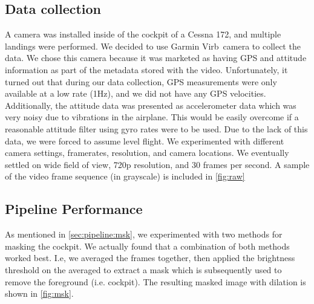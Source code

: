 \documentclass[letterpaper, conference]{IEEEtran}  %
\begin{document}
\subsection{Data collection}
A camera was installed inside of the cockpit of a Cessna 172, and multiple landings were performed. We decided to use Garmin Virb\texttrademark  \ camera to collect the data. We chose this camera because it was marketed as having GPS and attitude information as part of the metadata stored with the video. Unfortunately, it turned out that during our data collection, GPS measurements were only available at a low rate (1Hz), and we did not have any GPS velocities. Additionally, the attitude data was presented as accelerometer data which was very noisy due to vibrations in the airplane. This would be easily overcome if a reasonable attitude filter using gyro rates were to be used. Due to the lack of this data, we were forced to assume level flight.
We experimented with different camera settings, framerates, resolution, and camera locations. We eventually settled on wide field of view, 720p resolution, and 30 frames per second. A sample of the video frame sequence (in grayscale) is included in \cref{fig:raw}

\subsection{Pipeline Performance}
As mentioned in \cref{sec:pipeline:msk}, we experimented with two methods for masking the cockpit. We actually found that a combination of both methods worked best. I.e, we averaged the frames together, then applied the brightness threshold on the averaged to extract a mask which is subsequently used to remove the foreground (i.e. cockpit). The resulting masked image with dilation is shown in \cref{fig:msk}.
\end{document}
